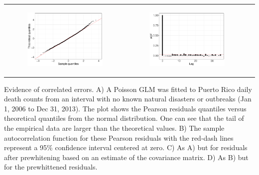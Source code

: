 \documentclass[11pt]{article}
\begin{document}
\begin{suppfigure}[ht]
\begin{tabular}{lll}
\begin{subfigure}[t]{0.49\linewidth}
		\includegraphics[width=1\linewidth]{figs/supp-figure-7c.pdf}
	\end{subfigure}&
	\begin{subfigure}[t]{0.49\linewidth}
    	\centering
	    \includegraphics[width=1\linewidth]{figs/supp-figure-7d.pdf}
    \end{subfigure}\\
    \end{tabular}
    \caption{Evidence of correlated errors. A) A Poisson GLM was fitted to Puerto Rico daily death counts from an interval with no known natural disasters or outbreaks (Jan 1, 2006 to Dec 31, 2013). The plot shows the Pearson residuals quantiles versus theoretical quantiles from the normal distribution. One can see that the tail of the empirical data are larger than the theoretical values. B) The sample autocorrelation function for these Pearson residuals with the red-dash lines represent a 95\% confidence interval centered at zero. C) As A) but for residuals after prewhitening based on an estimate of the covariance matrix. D) As B) but for the prewhittened residuals.}
    \label{supp-fig:correlated-errors}
\end{suppfigure}
\end{document}
